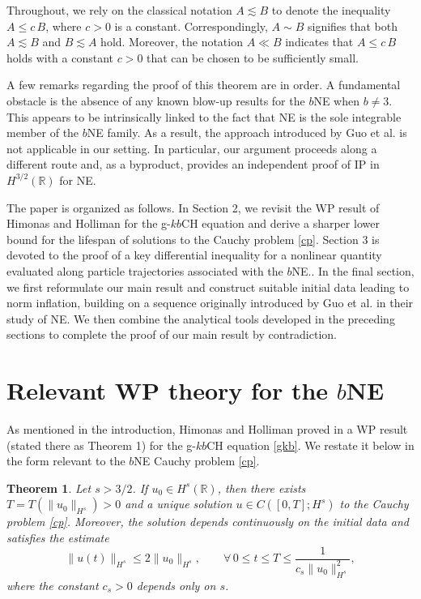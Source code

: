 \documentclass{amsart}
\newtheorem{theorem}{Theorem}
\newcommand{\R}{\mathbb R}
\begin{document}
Throughout, we rely on the classical notation $A\lesssim B$ to denote the inequality $A\leq c\,B$, where $c>0$ is a constant. Correspondingly, $A\sim B$ signifies that both $A\lesssim B$ and $B\lesssim A$ hold. Moreover, the notation $A\ll B$ indicates that $A\leq c\,B$ holds with a constant $c>0$ that can be chosen to be sufficiently small.
 
A few remarks regarding the proof of this theorem are in order. A fundamental obstacle is the absence of any known blow-up results for the $b$NE when $b\neq 3$. This appears to be intrinsically linked to the fact that NE is the sole integrable member of the $b$NE family. As a result, the approach introduced by Guo et al. \cite{GLM19} is not applicable in our setting. In particular, our argument proceeds along a different route and, as a byproduct, provides an independent proof of IP in $H^{3/2}(\R)$ for NE.

The paper is organized as follows. In Section 2, we revisit the WP result of Himonas and Holliman \cite{HH14} for the g-$kb$CH equation and derive a sharper lower bound for the lifespan of solutions to the Cauchy problem \eqref{cp}. Section 3 is devoted to the proof of a key differential inequality for a nonlinear quantity evaluated along particle trajectories associated with the $b$NE.. In the final section, we first reformulate our main result and construct suitable initial data leading to norm inflation, building on a sequence originally introduced by Guo et al. \cite{GLM19} in their study of NE. We then combine the analytical tools developed in the preceding sections to complete the proof of our main result by contradiction.



\section{Relevant WP theory for the $b$NE}
As mentioned in the introduction, Himonas and Holliman proved in \cite{HH14} a WP result (stated there as Theorem 1) for the  g-$kb$CH equation \eqref{gkb}. We restate it below in the form relevant to the $b$NE Cauchy problem \eqref{cp}.

\begin{theorem}
Let $s>3/2$. If $u_0\in H^s(\R)$, then there exists $T=T( \|u_0\|_{H^s})>0$ and a unique solution $u\in C([0, T]; H^s)$ to the Cauchy problem \eqref{cp}. Moreover, the solution depends continuously on the initial data and satisfies the estimate 
\[
\|u(t)\|_{H^s}\leq 2 \|u_0\|_{H^s}, \qquad \forall\, 0\leq t\leq T\leq \frac{1}{c_s\|u_0\|^2_{H^s}},
\]
where the constant $c_s>0$ depends only on $s$.
\label{hh}
\end{theorem}
\end{document}

